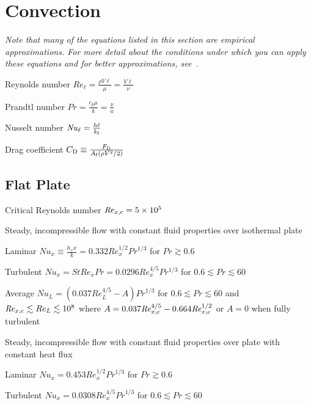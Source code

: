 \documentclass{article}
\begin{document}
\section{Convection}
\label{sec:convection}

\emph{Note that many of the equations listed in this section are empirical approximations. For more
  detail about the conditions under which you can apply these equations and for better
  approximations, see~\cite{hamt}.}

\begin{description*}
\item[Reynolds number]
  \(\mathit{Re}_\ell = \frac{\rho{}V\ell}{\mu} = \frac{V\ell}{\nu}\)
\item[Prandtl number]
  \(\mathit{Pr} = \frac{c_p\mu}{k} = \frac{\nu}{a}\)
\item[Nusselt number]
  \(\mathit{Nu}_\ell = \frac{h\ell}{k_{\mathrm{f}}}\)
\item[Drag coefficient]
  \(C_{\mathrm{D}} \equiv \frac{F_{\mathrm{D}}}{A_{\mathrm{f}}(\rho V^2/2)}\)
\end{description*}

\subsection{Flat Plate}
\begin{description*}
\item[Critical Reynolds number]
  \(\mathit{Re}_{x,\mathrm{c}} = \num{5e5}\)
\item[Steady, incompressible flow with constant fluid properties over isothermal plate]~
  \begin{description*}
  \item[Laminar]
    \(\mathit{Nu}_x \equiv \frac{h_x x}{k} = 0.332\mathit{Re}_x^{1/2}\mathit{Pr}^{1/3}\) for
    \(\mathit{Pr} \gtrsim 0.6\)
  \item[Turbulent]
    \(\mathit{Nu}_x = \mathit{St}\mathit{Re}_x\mathit{Pr} = 0.0296\mathit{Re}_x^{4/5}Pr^{1/3}\) for
    \(0.6 \lesssim \mathit{Pr} \lesssim 60\)
  \item[Average]
    \(\overline{\mathit{Nu}}_L = (0.037\mathit{Re}_L^{4/5} - A)\mathit{Pr}^{1/3}\) for
    \(0.6 \lesssim \mathit{Pr} \lesssim 60\) and \(\mathit{Re}_{x,\mathrm{c}} \lesssim Re_L \lesssim 10^8\) where
    \(A = 0.037\mathit{Re}_{x,\mathrm{c}}^{4/5} - 0.664\mathit{Re}_{x,\mathrm{c}}^{1/2}\)
    or \(A = 0\) when fully turbulent
  \end{description*}
\item[Steady, incompressible flow with constant fluid properties over plate with constant heat flux]~
  \begin{description*}
  \item[Laminar]
    \(\mathit{Nu}_x = 0.453\mathit{Re}_x^{1/2}\mathit{Pr}^{1/3}\) for \(\mathit{Pr} \gtrsim 0.6\)
  \item[Turbulent]
    \(\mathit{Nu}_x = 0.0308\mathit{Re}_x^{4/5}\mathit{Pr}^{1/3}\) for \(0.6 \lesssim \mathit{Pr} \lesssim 60\)
  \end{description*}
\end{description*}
\end{document}

